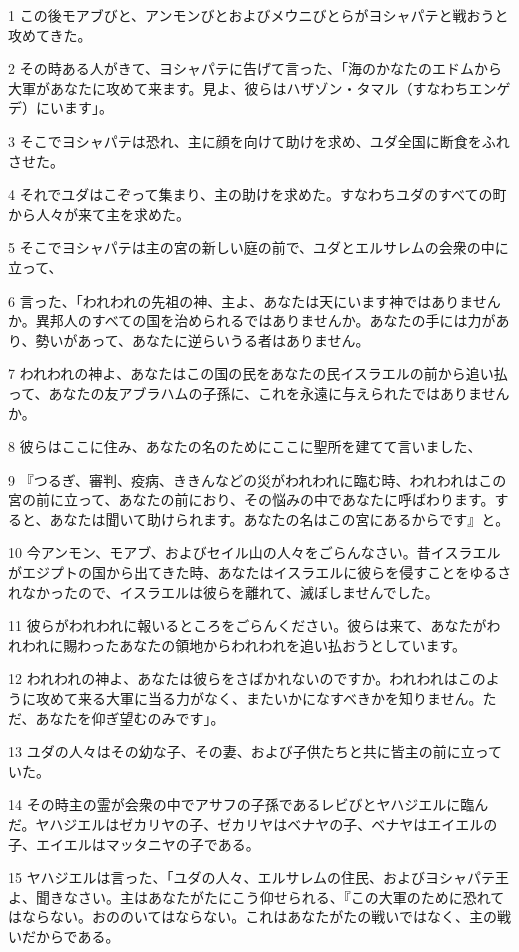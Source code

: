 \par 1 この後モアブびと、アンモンびとおよびメウニびとらがヨシャパテと戦おうと攻めてきた。
\par 2 その時ある人がきて、ヨシャパテに告げて言った、「海のかなたのエドムから大軍があなたに攻めて来ます。見よ、彼らはハザゾン・タマル（すなわちエンゲデ）にいます」。
\par 3 そこでヨシャパテは恐れ、主に顔を向けて助けを求め、ユダ全国に断食をふれさせた。
\par 4 それでユダはこぞって集まり、主の助けを求めた。すなわちユダのすべての町から人々が来て主を求めた。
\par 5 そこでヨシャパテは主の宮の新しい庭の前で、ユダとエルサレムの会衆の中に立って、
\par 6 言った、「われわれの先祖の神、主よ、あなたは天にいます神ではありませんか。異邦人のすべての国を治められるではありませんか。あなたの手には力があり、勢いがあって、あなたに逆らいうる者はありません。
\par 7 われわれの神よ、あなたはこの国の民をあなたの民イスラエルの前から追い払って、あなたの友アブラハムの子孫に、これを永遠に与えられたではありませんか。
\par 8 彼らはここに住み、あなたの名のためにここに聖所を建てて言いました、
\par 9 『つるぎ、審判、疫病、ききんなどの災がわれわれに臨む時、われわれはこの宮の前に立って、あなたの前におり、その悩みの中であなたに呼ばわります。すると、あなたは聞いて助けられます。あなたの名はこの宮にあるからです』と。
\par 10 今アンモン、モアブ、およびセイル山の人々をごらんなさい。昔イスラエルがエジプトの国から出てきた時、あなたはイスラエルに彼らを侵すことをゆるされなかったので、イスラエルは彼らを離れて、滅ぼしませんでした。
\par 11 彼らがわれわれに報いるところをごらんください。彼らは来て、あなたがわれわれに賜わったあなたの領地からわれわれを追い払おうとしています。
\par 12 われわれの神よ、あなたは彼らをさばかれないのですか。われわれはこのように攻めて来る大軍に当る力がなく、またいかになすべきかを知りません。ただ、あなたを仰ぎ望むのみです」。
\par 13 ユダの人々はその幼な子、その妻、および子供たちと共に皆主の前に立っていた。
\par 14 その時主の霊が会衆の中でアサフの子孫であるレビびとヤハジエルに臨んだ。ヤハジエルはゼカリヤの子、ゼカリヤはベナヤの子、ベナヤはエイエルの子、エイエルはマッタニヤの子である。
\par 15 ヤハジエルは言った、「ユダの人々、エルサレムの住民、およびヨシャパテ王よ、聞きなさい。主はあなたがたにこう仰せられる、『この大軍のために恐れてはならない。おののいてはならない。これはあなたがたの戦いではなく、主の戦いだからである。
